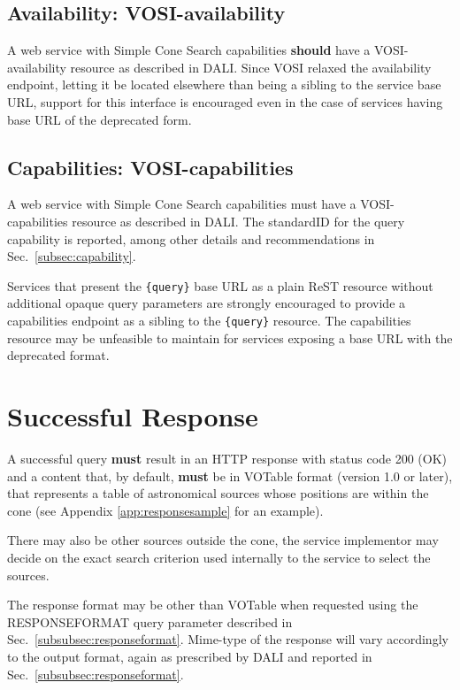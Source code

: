 \documentclass[11pt,a4paper]{ivoa}
\begin{document}
\subsection{Availability: VOSI-availability}
A web service with Simple Cone Search capabilities \textbf{should} have a VOSI-availability resource as described in DALI. Since VOSI relaxed the availability endpoint, letting it be located elsewhere than being a sibling to the service base URL, support for this interface is encouraged even in the case of services having base URL of the deprecated form.

\subsection{Capabilities: VOSI-capabilities}
A web service with Simple Cone Search capabilities must have a VOSI-capabilities resource as described in DALI. The standardID for the {query} capability is reported, among other details and recommendations in Sec.~\ref{subsec:capability}.

Services that present the \texttt{\{query\}} base URL as a plain ReST resource without additional opaque query parameters are strongly encouraged to provide a capabilities endpoint as a sibling to the \texttt{\{query\}} resource. The capabilities resource may be unfeasible to maintain for services exposing a base URL with the deprecated format.

\section{Successful Response}
\label{sec:response}
A successful query \textbf{must} result in an HTTP response with status code 200 (OK) and a content that, by default, \textbf{must} be in VOTable format (version 1.0 or later), that represents a table of astronomical sources whose positions are within the cone (see Appendix \ref{app:responsesample} for an example).  

There may also be other sources outside the cone, the service implementor may decide on the exact search criterion used internally to the service to select the sources.

The response format may be other than VOTable when requested using the RESPONSEFORMAT query parameter described in Sec.~\ref{subsubsec:responseformat}. Mime-type of the response will vary accordingly to the output format, again as prescribed by DALI and reported in Sec.~\ref{subsubsec:responseformat}.
\end{document}
